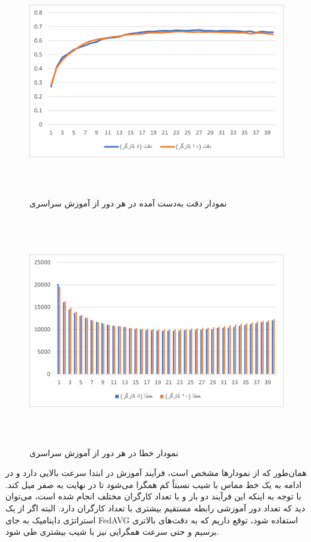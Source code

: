 \begin{figure}[H]
    \centering
   \includegraphics[height=10cm,width=14cm]{./charts/acc.png}
   \caption{ نمودار دقت به‌دست آمده در هر دور از آموزش سراسری}
   \label{ acc }
   \centering
\end{figure}

\begin{figure}[H]
    \centering
   \includegraphics[height=10cm,width=14cm]{./charts/loss.png}
   \caption{ نمودار خطا در هر دور از آموزش سراسری }
   \label{ loss }
   \centering
\end{figure}

همان‌طور که از نمودار‌ها مشخص است، فرآیند آموزش در ابتدا سرعت بالایی دارد و در ادامه به یک خط مماس با شیب نسبتاً کم همگرا می‌شود تا در نهایت به صفر میل کند. با توجه به اینکه این فرآیند دو بار و با تعداد کارگران مختلف انجام شده است، می‌توان دید که تعداد دور آموزشی رابطه مستقیم بیشتری با تعداد کارگران دارد. البته اگر از یک استراتژی داینامیک به جای FedAVG استفاده شود، توقع داریم که به دقت‌های بالاتری برسیم و حتی سرعت همگرایی نیز با شیب بیشتری طی شود.

